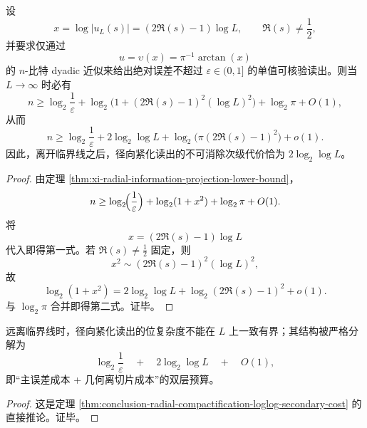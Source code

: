 \begin{theorem}\label{thm:conclusion-radial-compactification-loglog-secondary-cost}
设
\[
x=\log|u_L(s)|=(2\Re(s)-1)\log L,
\qquad
\Re(s)\neq \frac12,
\]
并要求仅通过
\[
u=\upsilon(x)=\pi^{-1}\arctan(x)
\]
的 \(n\)-比特 dyadic 近似来给出绝对误差不超过 \(\varepsilon\in(0,1]\) 的单值可核验读出。则当 \(L\to\infty\) 时必有
\[
n\ge
\log_2\frac1\varepsilon
+
\log_2\!\bigl(1+(2\Re(s)-1)^2(\log L)^2\bigr)
+
\log_2\pi
+
O(1),
\]
从而
\[
n\ge
\log_2\frac1\varepsilon
+
2\log_2\log L
+
\log_2\!\bigl(\pi(2\Re(s)-1)^2\bigr)
+
o(1).
\]
因此，离开临界线之后，径向紧化读出的不可消除次级代价恰为 \(2\log_2\log L\)。
\end{theorem}
\begin{proof}
由定理 \ref{thm:xi-radial-information-projection-lower-bound}，
\[
n\ge
\log_2\!\Bigl(\frac{1}{\varepsilon}\Bigr)
+
\log_2(1+x^2)
+
\log_2\pi
+
O(1).
\]
将
\[
x=(2\Re(s)-1)\log L
\]
代入即得第一式。若 \(\Re(s)\neq \tfrac12\) 固定，则
\[
x^2\sim (2\Re(s)-1)^2(\log L)^2,
\]
故
\[
\log_2(1+x^2)
=
2\log_2\log L+\log_2(2\Re(s)-1)^2+o(1).
\]
与 \(\log_2\pi\) 合并即得第二式。证毕。
\end{proof}

\begin{corollary}[径向紧化的双对数尾项]\label{cor:conclusion-radial-compactification-doublelog-tail}
远离临界线时，径向紧化读出的位复杂度不能在 \(L\) 上一致有界；其结构被严格分解为
\[
\log_2\frac1\varepsilon
\quad+\quad
2\log_2\log L
\quad+\quad
O(1),
\]
即“主误差成本 + 几何离切片成本”的双层预算。
\end{corollary}
\begin{proof}
这是定理 \ref{thm:conclusion-radial-compactification-loglog-secondary-cost} 的直接推论。证毕。
\end{proof}

\endinput
